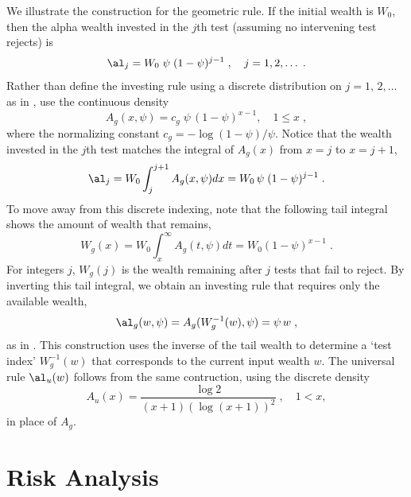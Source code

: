 \documentclass[12pt]{article}
\begin{document}
We illustrate the construction for the geometric rule.  If the initial wealth
 is $W_0$, then the alpha wealth invested in the $j$th test (assuming no
 intervening test rejects) is
 \begin{equation}
    \al_j = W_0\; \psi \; (1-\psi)^{j-1} \;, \quad j = 1, 2, \ldots\;.   
 \label{eq:alj1}
 \end{equation}
  Rather than define the investing rule using a discrete distribution on
 $j=1,\,2,\ldots$ as in , use the continuous density
 \begin{equation}
   A_g(x,\psi) = c_g \; \psi\,(1-\psi)^{x-1}, \quad 1 \le x\;,
 \label{eq:alg}
 \end{equation}
 where the normalizing constant $c_g = -\log (1-\psi)/\psi$.  Notice that the
 wealth invested in the $j$th test  matches the integral of
 $A_g(x)$ from $x=j$ to $x=j+1$,
 \begin{equation}
    \al_j = W_0 \int_j^{j+1} A_g(x,\psi) dx = W_0 \, \psi\; (1-\psi)^{j-1} \;.
 \label{eq:alj2}
 \end{equation}
 To move away from this discrete indexing, note that the following tail integral
 shows the amount of wealth that remains,
 \begin{equation}
    W_g(x) = W_0 \int_x^\infty A_g(t,\psi) dt = W_0 (1-\psi)^{x-1}\;.
 \label{eq:Wg}
 \end{equation}
 For integers $j$, $W_g(j)$ is the wealth remaining after $j$ tests that fail to
 reject.  By inverting this tail integral, we obtain an investing rule that
 requires only the available wealth,
 \begin{equation}
   \al_g(w,\psi) = A_g(W_g^{-1}(w),\psi) = \psi\,w \;,
 \label{eq:Ag}
 \end{equation}
 as in .  This construction uses the inverse of the tail wealth to
 determine a `test index' $W_g^{-1}(w)$ that corresponds to the current input
 wealth $w$.  The universal rule $\al_u(w)$ follows from the same
 contruction, using the discrete density
 \begin{displaymath}
    A_u(x) = \frac{\log 2}{(x+1) (\log(x+1))^2} \;, \quad 1 < x,
 \end{displaymath}
 in place of $A_g$.

\section{ Risk Analysis}
\end{document}
